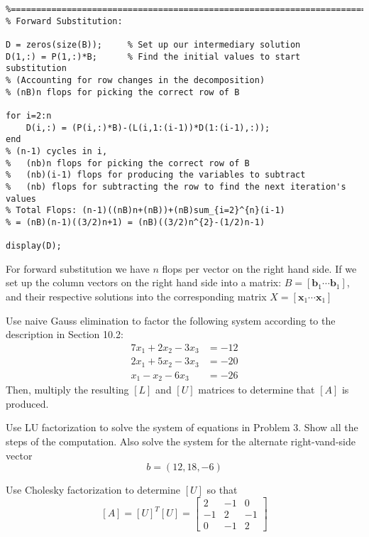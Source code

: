 \documentclass{article}
\begin{document}
\begin{solution}
\begin{lstlisting}
%==========================================================================
% Forward Substitution:

D = zeros(size(B));     % Set up our intermediary solution
D(1,:) = P(1,:)*B;      % Find the initial values to start substitution
% (Accounting for row changes in the decomposition)
% (nB)n flops for picking the correct row of B

for i=2:n
    D(i,:) = (P(i,:)*B)-(L(i,1:(i-1))*D(1:(i-1),:));
end
% (n-1) cycles in i,
%   (nb)n flops for picking the correct row of B
%   (nb)(i-1) flops for producing the variables to subtract
%   (nb) flops for subtracting the row to find the next iteration's values
% Total Flops: (n-1)((nB)n+(nB))+(nB)sum_{i=2}^{n}(i-1)
% = (nB)(n-1)((3/2)n+1) = (nB)((3/2)n^{2}-(1/2)n-1)

display(D);
\end{lstlisting}

For forward substitution we have $n$ flops per vector on the right hand side. If we set up the column vectors on the right hand side into a matrix: $B = [\mathbf{b}_{1} \cdots \mathbf{b}_{1}]$, and their respective solutions into the corresponding matrix $X = [\mathbf{x}_{1} \cdots \mathbf{x}_{1}]$
\end{solution}

\setcounter{problem}{2}
\begin{problem}
Use naive Gauss elimination to factor the following system according to the description in Section 10.2:
\begin{align*}
7x_{1} + 2x_{2} - 3x_{3} &= -12 \\
2x_{1} + 5x_{2} - 3x_{3} &= -20 \\
x_{1} - x_{2} - 6x_{3} &= -26
\end{align*}
Then, multiply the resulting $[L]$ and $[U]$ matrices to determine that $[A]$ is produced.
\end{problem}

\begin{problem}
Use LU factorization to solve the system of equations in Problem 3. Show all the steps of the computation. Also solve the system for the alternate right-vand-side vector
\[ b = (12,18,-6) \]
\end{problem}

\setcounter{problem}{12}
\begin{problem}
Use Cholesky factorization to determine $[U]$ so that
\[ [A] = [U]^{T}[U] =
\begin{bmatrix}
2	&	-1	&	0	\\
-1	&	2	&	-1	\\
0	&	-1	&	2
\end{bmatrix} \]
\end{problem}
\end{document}
